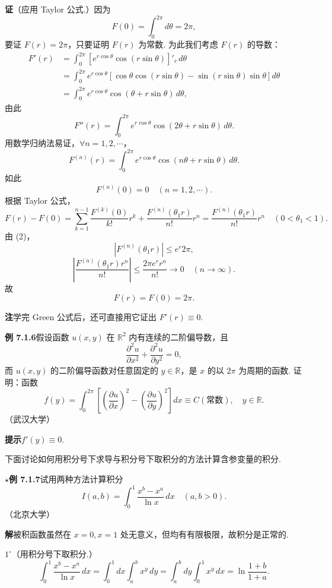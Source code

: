 \documentclass[UTF8,12pt,a4paper,fontset=fandol]{ctexart}
\begin{document}
\noindent\textbf{证}\quad （应用 Taylor 公式.）因为
\[
F(0)=\int_0^{2\pi}d\theta=2\pi,
\]
要证 $F(r)=2\pi$，只要证明 $F(r)$ 为常数. 为此我们考虑 $F(r)$ 的导数：
\begin{equation}
\begin{aligned}
F'(r)
&=\int_0^{2\pi}\left[e^{r\cos\theta}\cos(r\sin\theta)\right]'_r\,d\theta\\
&=\int_0^{2\pi}e^{r\cos\theta}
\left[\cos\theta\cos(r\sin\theta)-\sin(r\sin\theta)\sin\theta\right]d\theta\\
&=\int_0^{2\pi}e^{r\cos\theta}\cos(\theta+r\sin\theta)\,d\theta,
\end{aligned}
\tag{1}
\end{equation}
由此
\[
F''(r)=\int_0^{2\pi}e^{r\cos\theta}\cos(2\theta+r\sin\theta)\,d\theta.
\]
用数学归纳法易证，$\forall n=1,2,\cdots$，
\begin{equation}
F^{(n)}(r)=\int_0^{2\pi}e^{r\cos\theta}\cos(n\theta+r\sin\theta)\,d\theta.
\tag{2}
\end{equation}
如此
\[
F^{(n)}(0)=0\quad(n=1,2,\cdots).
\]
根据 Taylor 公式，
\[
F(r)-F(0)=\sum_{k=1}^{n-1}\frac{F^{(k)}(0)}{k!}r^k
+\frac{F^{(n)}(\theta_1r)}{n!}r^n
=\frac{F^{(n)}(\theta_1r)}{n!}r^n\quad(0<\theta_1<1).
\]
由 (2)，
\[
|F^{(n)}(\theta_1r)|\le e^r2\pi,
\]
\[
\left|\frac{F^{(n)}(\theta_1r)r^n}{n!}\right|
\le\frac{2\pi e^r r^n}{n!}\to0\quad(n\to\infty).
\]
故
\[
F(r)=F(0)=2\pi.
\]

\noindent\textbf{注}\quad 学完 Green 公式后，还可直接用它证出 $F'(r)\equiv0$.

\noindent\textbf{例 7.1.6}\quad 假设函数 $u(x,y)$ 在 $\mathbb{R}^2$ 内有连续的二阶偏导数，且
\[
\frac{\partial^2u}{\partial x^2}+\frac{\partial^2u}{\partial y^2}=0,
\]
而 $u(x,y)$ 的二阶偏导函数对任意固定的 $y\in\mathbb{R}$，是 $x$ 的以 $2\pi$ 为周期的函数. 证明：函数
\[
f(y)=\int_0^{2\pi}\left[\left(\frac{\partial u}{\partial x}\right)^2
-\left(\frac{\partial u}{\partial y}\right)^2\right]dx
\equiv C(\text{常数}),\quad y\in\mathbb{R}.
\]
（武汉大学）

\noindent\textbf{提示}\quad $f'(y)\equiv0$.

下面讨论如何用积分号下求导与积分号下取积分的方法计算含参变量的积分.

\noindent\textbf{$\star$例 7.1.7}\quad 试用两种方法计算积分
\[
I(a,b)=\int_0^1\frac{x^b-x^a}{\ln x}\,dx\quad(a,b>0).
\]
（北京大学）

\noindent\textbf{解}\quad 被积函数虽然在 $x=0,x=1$ 处无意义，但均有有限极限，故积分是正常的.

$1^\circ$（用积分号下取积分.）
\[
\int_0^1\frac{x^b-x^a}{\ln x}\,dx
=\int_0^1dx\int_a^b x^y\,dy
=\int_a^bdy\int_0^1x^y\,dx
=\ln\frac{1+b}{1+a}.
\]
\end{document}
